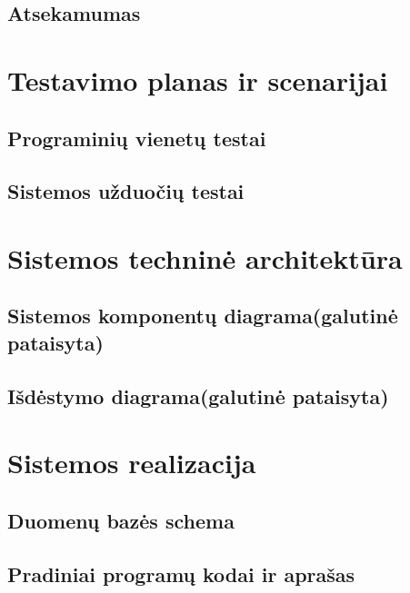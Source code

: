 \documentclass[oneside]{VUMIFPSkursinis}
\begin{document}
	\subsection{Atsekamumas}

\section{Testavimo planas ir scenarijai}
	\subsection{Programinių vienetų testai}
	\subsection{Sistemos užduočių testai}

\section{Sistemos techninė architektūra}
	\subsection{Sistemos komponentų diagrama(galutinė pataisyta)}
	\subsection{Išdėstymo diagrama(galutinė pataisyta)}




\section{Sistemos realizacija}
	\subsection{Duomenų bazės schema}
	\subsection{Pradiniai programų kodai ir aprašas}
\end{document}
